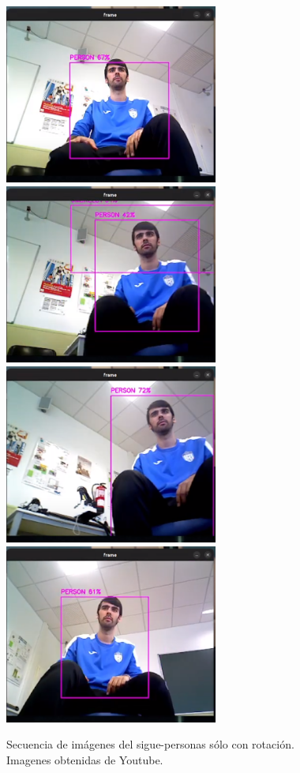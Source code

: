 \begin{figure} [H]
    \begin{center}
        \includegraphics[width=7cm]{figs/c5/sec_rot1.png}
        \includegraphics[width=7cm]{figs/c5/sec_rot2.png}
        \includegraphics[width=7cm]{figs/c5/sec_rot3.png}
        \includegraphics[width=7cm]{figs/c5/sec_rot4.png}
    \end{center}
    \caption[Secuencia sigue-personas rotación]{Secuencia de imágenes del sigue-personas sólo con rotación. Imagenes obtenidas de Youtube\footnotemark.}
    \label{fig:sec_FP_rot}
\end{figure}

